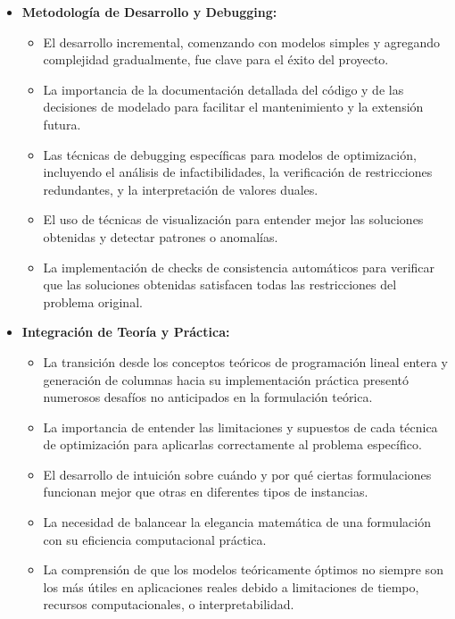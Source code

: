 \documentclass[a4paper,12pt]{article}
\begin{document}
\begin{itemize}
    \item \textbf{Metodología de Desarrollo y Debugging:}
    \begin{itemize}
        \item El desarrollo incremental, comenzando con modelos simples y agregando complejidad gradualmente, fue clave para el éxito del proyecto.
        \item La importancia de la documentación detallada del código y de las decisiones de modelado para facilitar el mantenimiento y la extensión futura.
        \item Las técnicas de debugging específicas para modelos de optimización, incluyendo el análisis de infactibilidades, la verificación de restricciones redundantes, y la interpretación de valores duales.
        \item El uso de técnicas de visualización para entender mejor las soluciones obtenidas y detectar patrones o anomalías.
        \item La implementación de checks de consistencia automáticos para verificar que las soluciones obtenidas satisfacen todas las restricciones del problema original.
    \end{itemize}
    
    \item \textbf{Integración de Teoría y Práctica:}
    \begin{itemize}
        \item La transición desde los conceptos teóricos de programación lineal entera y generación de columnas hacia su implementación práctica presentó numerosos desafíos no anticipados en la formulación teórica.
        \item La importancia de entender las limitaciones y supuestos de cada técnica de optimización para aplicarlas correctamente al problema específico.
        \item El desarrollo de intuición sobre cuándo y por qué ciertas formulaciones funcionan mejor que otras en diferentes tipos de instancias.
        \item La necesidad de balancear la elegancia matemática de una formulación con su eficiencia computacional práctica.
        \item La comprensión de que los modelos teóricamente óptimos no siempre son los más útiles en aplicaciones reales debido a limitaciones de tiempo, recursos computacionales, o interpretabilidad.
    \end{itemize}
    

\end{itemize}
\end{document}
